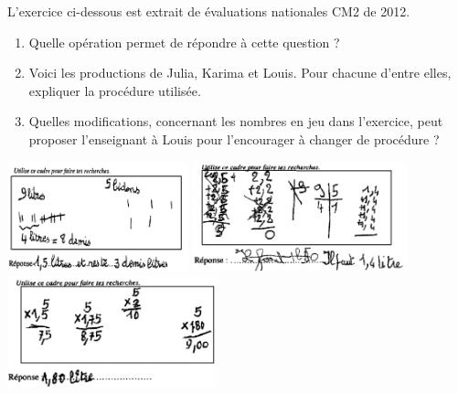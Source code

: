 \begin{exercice}[CRPE 2017 G1]
   L'exercice ci-dessous est extrait de évaluations nationales CM2 de 2012.
   \begin{center}
   \end{center}
   \begin{enumerate}
      \item Quelle opération permet de répondre à cette question ?
      \item Voici les productions de Julia, Karima et Louis. Pour chacune d’entre elles, expliquer la procédure utilisée.
      \item Quelles modifications, concernant les nombres en jeu dans l’exercice, peut proposer l’enseignant à Louis pour l’encourager à changer de procédure ? \vspace*{-0.4cm}
   \end{enumerate}
   \includegraphics[height=3.2cm]{Nombres_et_calculs_did/Images/Num3_analyse_Julia} \includegraphics[height=3.2cm]{Nombres_et_calculs_did/Images/Num3_analyse_Karima}  \includegraphics[height=3.2cm]{Nombres_et_calculs_did/Images/Num3_analyse_Louis}
\end{exercice}


